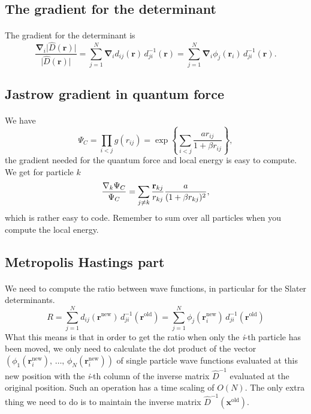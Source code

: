 \documentclass[%
twoside,                 %
final,                   %
10pt]{article}
\begin{document}
\subsection*{The gradient for the determinant}

\paragraph{}
The gradient for the determinant is 
\[
\frac{\mathbf{\nabla}_i\vert\hat{D}(\mathbf{r})\vert}
{\vert\hat{D}(\mathbf{r})\vert} =
\sum_{j=1}^N \mathbf{\nabla}_i d_{ij}(\mathbf{r})\,
d_{ji}^{-1}(\mathbf{r}) =
\sum_{j=1}^N \mathbf{\nabla}_i \phi_j(\mathbf{r}_i)\,
d_{ji}^{-1}(\mathbf{r}).
\]



\subsection*{Jastrow gradient in quantum force}

\paragraph{}
We have
\[
\Psi_C=\prod_{i< j}g(r_{ij})= \exp{\left\{\sum_{i<j}\frac{ar_{ij}}{1+\beta r_{ij}}\right\}},
\]
the gradient needed for the quantum force and local energy is easy to compute.  
We get for particle  $k$
\[
\frac{ \nabla_k \Psi_C}{ \Psi_C }= \sum_{j\ne k}\frac{{\bf r}_{kj}}{r_{kj}}\frac{a}{(1+\beta r_{kj})^2},
\]
which is rather easy to code.  Remember to sum over all particles  when you compute the local energy.



\subsection*{Metropolis Hastings part}

\paragraph{}
We need to compute the ratio between wave functions, in particular  for the Slater determinants.
\[
R =\sum_{j=1}^N d_{ij}(\mathbf{r}^{\mathrm{new}})\,
d_{ji}^{-1}(\mathbf{r}^{\mathrm{old}}) = 
\sum_{j=1}^N \phi_j(\mathbf{r}_i^{\mathrm{new}})\,
d_{ji}^{-1}(\mathbf{r}^{\mathrm{old}})
\]
What this means is that in order to get the ratio when only the \emph{i}-th
particle  has been moved, we only need to calculate the dot
product of the vector $\left(\phi_1(\mathbf{r}_i^\mathrm{new}),\,\dots,\,
\phi_N(\mathbf{r}_i^\mathrm{new})\right)$ of single particle  wave functions
evaluated at this new position with the \emph{i}-th column of the inverse
matrix $\hat{D}^{-1}$ evaluated at the original position. Such
an operation has a time scaling of $O(N)$. The only extra thing we
need to do is to maintain the inverse matrix 
$\hat{D}^{-1}(\mathbf{x}^{\mathrm{old}})$.
\end{document}
